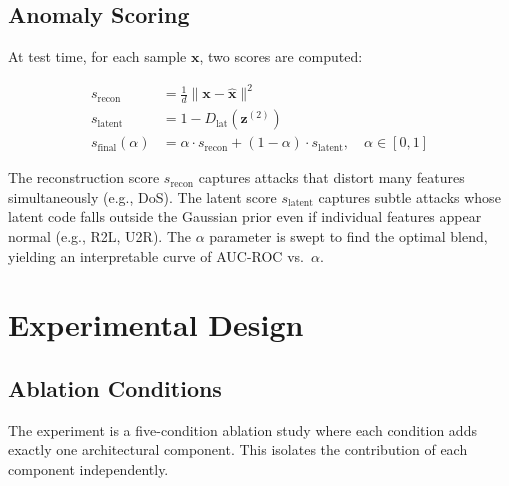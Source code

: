 \documentclass[12pt,a4paper]{article}
\begin{document}
\subsection{Anomaly Scoring}

At test time, for each sample $\mathbf{x}$, two scores are computed:

\begin{align}
s_\text{recon} &= \tfrac{1}{d}\|\mathbf{x} - \hat{\mathbf{x}}\|^2
    \label{eq:score_recon}\\
s_\text{latent} &= 1 - D_\text{lat}(\mathbf{z}^{(2)})
    \label{eq:score_latent}\\
s_\text{final}(\alpha) &= \alpha \cdot s_\text{recon}
    + (1 - \alpha) \cdot s_\text{latent},\quad \alpha \in [0, 1]
    \label{eq:score_final}
\end{align}

\noindent
The reconstruction score $s_\text{recon}$ captures attacks that distort many
features simultaneously (e.g., DoS). The latent score $s_\text{latent}$
captures subtle attacks whose latent code falls outside the Gaussian prior
even if individual features appear normal (e.g., R2L, U2R). The $\alpha$
parameter is swept to find the optimal blend, yielding an interpretable
curve of AUC-ROC vs.\ $\alpha$.

\section{Experimental Design}

\subsection{Ablation Conditions}

The experiment is a five-condition ablation study where each condition adds
exactly one architectural component. This isolates the contribution of each
component independently.
\end{document}
